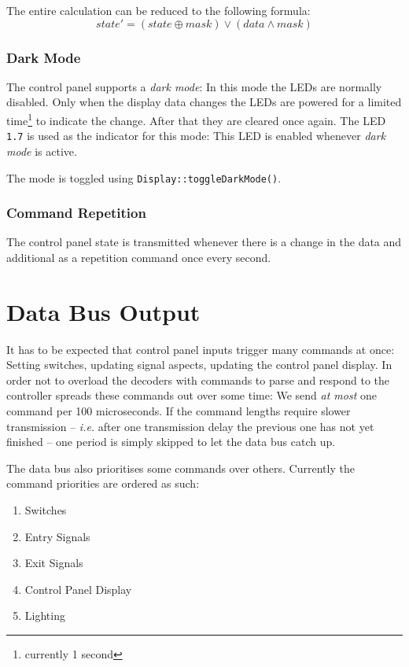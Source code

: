 \documentclass{scrreprt}
\newcommand\ie{\emph{i.e. }}
\newcommand{\code}[1]{\texttt{#1}}
\begin{document}
The entire calculation can be reduced to the following formula:
\[ state' = (state \oplus mask) \lor (data \land mask) \]

\subsubsection{Dark Mode}
The control panel supports a \emph{dark mode}:
In this mode the LEDs are normally disabled.
Only when the display data changes the LEDs are powered for a limited time\footnote{currently 1 second} to indicate the change.
After that they are cleared once again.
The LED \code{1.7} is used as the indicator for this mode:
This LED is enabled whenever \emph{dark mode} is active.

The mode is toggled using \code{Display::toggleDarkMode()}.

\subsubsection{Command Repetition}
The control panel state is transmitted whenever there is a change in the data and additional as a repetition command once every second.

\section{Data Bus Output}
It has to be expected that control panel inputs trigger many commands at once: Setting switches, updating signal aspects, updating the control panel display.
In order not to overload the decoders with commands to parse and respond to the controller spreads these commands out over some time:
We send \emph{at most} one command per 100 microseconds.
If the command lengths require slower transmission -- \ie after one transmission delay the previous one has not yet finished -- one period is simply skipped to let the data bus catch up.

The data bus also prioritises some commands over others.
Currently the command priorities are ordered as such:

\begin{enumerate}
\item Switches
\item Entry Signals
\item Exit Signals
\item Control Panel Display
\item Lighting
\end{enumerate}
\end{document}
